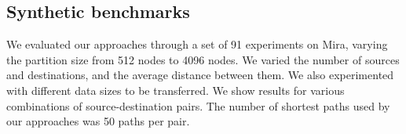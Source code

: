 \subsection{Synthetic benchmarks}
We evaluated our approaches through a set of 91 experiments on Mira, varying the partition size from 512 nodes to 4096 nodes. We varied the number of sources and destinations, and the average distance between them. We also experimented with different data sizes to be transferred. We show results for various combinations of source-destination pairs. The number of shortest paths used by our approaches was 50 paths per pair.
